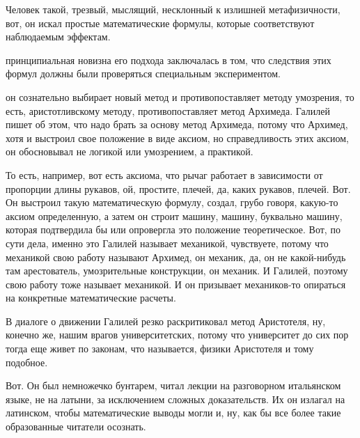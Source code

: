 Человек такой,
трезвый, мыслящий, несклонный к излишней метафизичности, вот, он искал простые
математические формулы, которые соответствуют наблюдаемым эффектам.

принципиальная новизна его подхода заключалась в том, что следствия этих формул
должны были проверяться специальным экспериментом. 


он сознательно выбирает новый
метод и противопоставляет методу умозрения, то есть, аристотливскому методу,
противопоставляет метод Архимеда. Галилей
пишет об этом, что надо брать за основу метод Архимеда, потому что Архимед, хотя
и выстроил свое положение в виде аксиом, но справедливость
этих аксиом, он обосновывал не логикой или умозрением, а практикой. 

То есть,
например, вот есть аксиома, что рычаг работает в зависимости от пропорции длины
рукавов, ой, простите, плечей, да, каких рукавов, плечей. Вот. Он выстроил такую
математическую формулу, создал, грубо говоря, какую-то аксиом определенную, а
затем он строит машину, машину, буквально машину, которая подтвердила бы или
опровергла это положение теоретическое. Вот, по сути дела, именно это Галилей
называет механикой, чувствуете, потому что механикой свою работу называют
Архимед, он механик, да, он не какой-нибудь там арестователь, умозрительные
конструкции, он механик. И Галилей, поэтому свою работу тоже называет механикой.
И он призывает механиков-то опираться на конкретные математические расчеты. 

В
диалоге о движении Галилей резко раскритиковал метод Аристотеля, ну, конечно же,
нашим врагов университетских, потому что университет до сих пор тогда еще живет
по законам, что называется, физики Аристотеля и тому подобное. 

Вот. Он был
немножечко бунтарем, читал лекции на разговорном итальянском языке, не на
латыни, за исключением сложных доказательств. Их он излагал на латинском, чтобы
математические выводы могли и, ну, как бы все более такие образованные читатели
осознать. 

